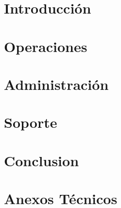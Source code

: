 \documentclass[
    11pt,
    oneside,
    openright,
    spanish,
    a4paper
]{book}
\begin{document}


\frontmatter
{}







\tableofcontents
\listoffigures
\listoftables

\mainmatter
{}

\part{Introducción}



\part{Operaciones}




\part{Administración}



\part{Soporte}



\part{Conclusion}


\appendix
\part{Anexos Técnicos}


\backmatter
\end{document}
